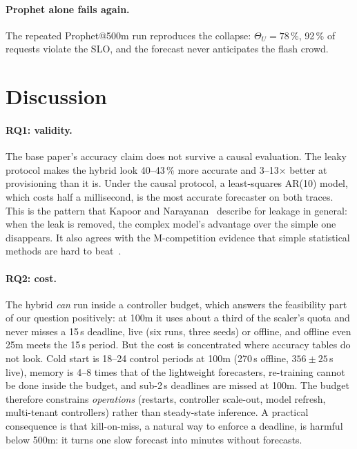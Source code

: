 \documentclass[conference,a4paper]{IEEEtran}
\begin{document}
\paragraph{Prophet alone fails again.} The repeated Prophet@500m run reproduces the collapse: $\Theta_U=78$\,\%,
92\,\% of requests violate the SLO, and the forecast never anticipates the flash crowd.

\section{Discussion}\label{sec:discussion}
\paragraph{RQ1: validity.} The base paper's accuracy claim does not survive a causal evaluation. The leaky
protocol makes the hybrid look 40--43\,\% more accurate and 3--13$\times$ better at provisioning than it is. Under
the causal protocol, a least-squares AR(10) model, which costs half a millisecond, is the most accurate
forecaster on both traces. This is the pattern that Kapoor and Narayanan~\cite{kapoor2023} describe for leakage in
general: when the leak is removed, the complex model's advantage over the simple one disappears. It also agrees
with the M-competition evidence that simple statistical methods are hard to beat~\cite{makridakis2018}.

\paragraph{RQ2: cost.} The hybrid \emph{can} run inside a controller budget, which answers the feasibility part
of our question positively: at 100m it uses about a third of the scaler's quota and never misses a 15\,s
deadline, live (six runs, three seeds) or offline, and offline even 25m meets the 15\,s period. But the cost is concentrated where accuracy tables do not look. Cold start is 18--24
control periods at 100m (270\,s offline, $356\pm25$\,s live), memory is 4--8 times that of the lightweight forecasters, re-training cannot be done
inside the budget, and sub-2\,s deadlines are missed at 100m. The budget therefore constrains \emph{operations}
(restarts, controller scale-out, model refresh, multi-tenant controllers) rather than steady-state inference.
A practical consequence is that kill-on-miss, a natural way to enforce a deadline, is harmful below 500m: it turns
one slow forecast into minutes without forecasts.
\end{document}
